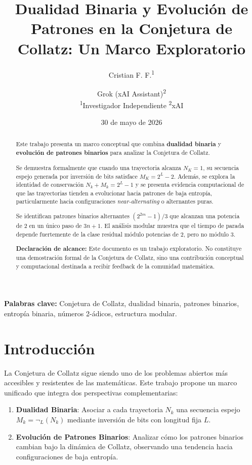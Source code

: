 \documentclass[11pt,a4paper]{article}
\title{\textbf{Dualidad Binaria y Evolución de Patrones en la Conjetura de Collatz: Un Marco Exploratorio}}
\author{
Cristian F. F.\textsuperscript{1} \and
Grok (xAI Assistant)\textsuperscript{2} \\
\smallskip
\textsuperscript{1}Investigador Independiente \quad
\textsuperscript{2}xAI
}
\date{30 de mayo de 2026}
\begin{document}
\maketitle

\begin{abstract}
Este trabajo presenta un marco conceptual que combina \textbf{dualidad binaria} y \textbf{evolución de patrones binarios} para analizar la Conjetura de Collatz.

Se demuestra formalmente que cuando una trayectoria alcanza $N_K = 1$, su secuencia espejo generada por inversión de bits satisface $M_K = 2^L - 2$. Además, se explora la identidad de conservación $N_k + M_k = 2^L - 1$ y se presenta evidencia computacional de que las trayectorias tienden a evolucionar hacia patrones de baja entropía, particularmente hacia configuraciones \textit{near-alternating} o alternantes puras.

Se identifican patrones binarios alternantes $(2^{2m}-1)/3$ que alcanzan una potencia de 2 en un único paso de $3n+1$. El análisis modular muestra que el tiempo de parada depende fuertemente de la clase residual módulo potencias de 2, pero no módulo 3.

\textbf{Declaración de alcance:} Este documento es un trabajo exploratorio. No constituye una demostración formal de la Conjetura de Collatz, sino una contribución conceptual y computacional destinada a recibir feedback de la comunidad matemática.
\end{abstract}

\textbf{Palabras clave:} Conjetura de Collatz, dualidad binaria, patrones binarios, entropía binaria, números 2-ádicos, estructura modular.

\section{Introducción}
\label{sec:intro}

La Conjetura de Collatz sigue siendo uno de los problemas abiertos más accesibles y resistentes de las matemáticas. Este trabajo propone un marco unificado que integra dos perspectivas complementarias:

\begin{enumerate}
    \item \textbf{Dualidad Binaria}: Asociar a cada trayectoria $N_k$ una secuencia espejo $M_k = \neg_L(N_k)$ mediante inversión de bits con longitud fija $L$.
    \item \textbf{Evolución de Patrones Binarios}: Analizar cómo los patrones binarios cambian bajo la dinámica de Collatz, observando una tendencia hacia configuraciones de baja entropía.
\end{enumerate}
\end{document}

